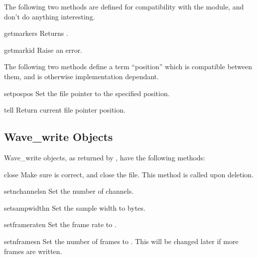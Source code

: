 The following two methods are defined for compatibility with the
 module, and don't do anything interesting.

\begin{methoddesc}{getmarkers}{}
Returns .
\end{methoddesc}

\begin{methoddesc}{getmark}{id}
Raise an error.
\end{methoddesc}

The following two methods define a term ``position'' which is compatible
between them, and is otherwise implementation dependant.

\begin{methoddesc}{setpos}{pos}
Set the file pointer to the specified position.
\end{methoddesc}

\begin{methoddesc}{tell}{}
Return current file pointer position.
\end{methoddesc}


\subsection{Wave_write Objects \label{Wave-write-objects}}

Wave_write objects, as returned by , have the
following methods:

\begin{methoddesc}{close}{}
Make sure  is correct, and close the file.
This method is called upon deletion.
\end{methoddesc}

\begin{methoddesc}{setnchannels}{n}
Set the number of channels.
\end{methoddesc}

\begin{methoddesc}{setsampwidth}{n}
Set the sample width to  bytes.
\end{methoddesc}

\begin{methoddesc}{setframerate}{n}
Set the frame rate to .
\end{methoddesc}

\begin{methoddesc}{setnframes}{n}
Set the number of frames to . This will be changed later if
more frames are written.
\end{methoddesc}

